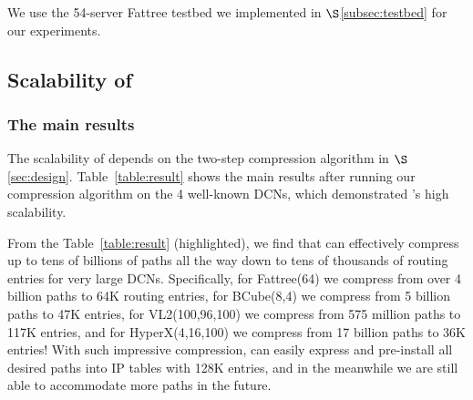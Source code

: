  We use the 54-server Fattree testbed we implemented in $\S$\ref{subsec:testbed} for our experiments.




\subsection{Scalability of \sys}\label{subsub:states}

\subsubsection{The main results}

 The scalability of \sys depends on the two-step compression algorithm in $\S$\ref{sec:design}. Table~\ref{table:result} shows the main results after running our compression algorithm on the 4 well-known DCNs, which demonstrated \sys's high scalability.

From the Table~\ref{table:result} (highlighted), we find that \sys can effectively compress up to tens of billions of paths all the way down to tens of thousands of routing entries for very large DCNs. Specifically, for Fattree(64) we compress from over 4 billion paths to 64K routing entries, for BCube(8,4) we compress from 5 billion paths to 47K entries, for VL2(100,96,100) we compress from 575 million paths to 117K entries, and for HyperX(4,16,100) we compress from 17 billion paths to 36K entries! With such impressive compression, \sys can easily express and pre-install all desired paths into IP tables with 128K entries, and in the meanwhile we are still able to accommodate more paths in the future.

